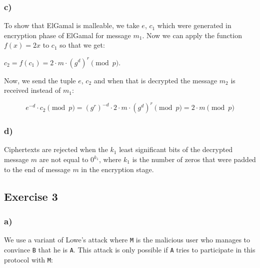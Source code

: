 \documentclass{article}
\begin{document}
\subsubsection{c)}\label{c}

To show that ElGamal is malleable, we take $e$, $c_1$ which were
generated in encryption phase of ElGamal for message $m_1$. Now we can
apply the function $f(x) = 2x$ to $c_1$ so that we get:

$c_2 = f(c_1) = 2 \cdot m \cdot (g^d)^r \pmod{p}$.

Now, we send the tuple $e$, $c_2$ and when that is decrypted the message
$m_2$ is received instead of $m_1$:

\[ e^{-d} \cdot c_2 \pmod{p} = (g^r)^{-d} \cdot 2 \cdot m \cdot (g^d)^r \pmod{p} = 2 \cdot m \pmod{p}\]

\subsubsection{d)}\label{d}

Ciphertexts are rejected when the $k_1$ least significant bits of the
decrypted message $m$ are not equal to $0^{k_1}$, where $k_1$ is the
number of zeros that were padded to the end of message $m$ in the
encryption stage.

    \subsection{Exercise 3}\label{exercise-3}

\subsubsection{a)}\label{a}

We use a variant of Lowe's attack where \texttt{M} is the malicious user
who manages to convince \texttt{B} that he is \texttt{A}. This attack is
only possible if \texttt{A} tries to participate in this protocol with
\texttt{M}:
\end{document}
